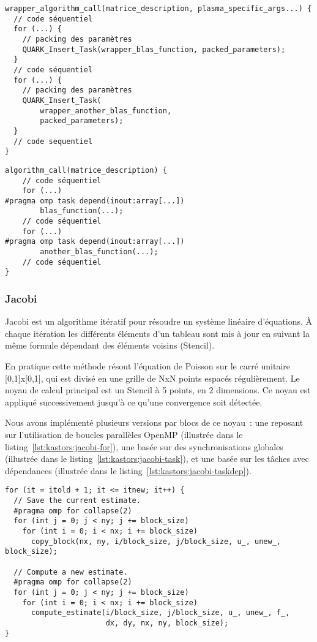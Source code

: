 \begin{lstlisting}[caption=Format de l'algorithme dynamique,label=lst:kastors:dyn]
wrapper_algorithm_call(matrice_description, plasma_specific_args...) {
  // code séquentiel
  for (...) {
    // packing des paramètres
    QUARK_Insert_Task(wrapper_blas_function, packed_parameters);
  }
  // code séquentiel
  for (...) {
    // packing des paramètres
    QUARK_Insert_Task(
        wrapper_another_blas_function,
        packed_parameters);
  }
  // code sequentiel
}
\end{lstlisting}
\begin{lstlisting}[caption=Format de l'algorithme OpenMP,label=lst:kastors:dyn-omp]
algorithm_call(matrice_description) {
    // code séquentiel
    for (...)
#pragma omp task depend(inout:array[...])
        blas_function(...);
    // code séquentiel
    for (...)
#pragma omp task depend(inout:array[...])
        another_blas_function(...);
    // code séquentiel
}
\end{lstlisting}


\subsubsection{Jacobi}

Jacobi est un algorithme itératif pour résoudre un système linéaire d'équations. À chaque itération les différents éléments d'un tableau sont mis à jour en suivant la même formule dépendant des éléments voisins (Stencil).

En pratique cette méthode résout l'équation de Poisson sur le carré unitaire [0,1]x[0,1], qui est divisé en une grille de NxN points espacés régulièrement.
Le noyau de calcul principal est un Stencil à 5 points, en 2 dimensions.
Ce noyau est appliqué successivement jusqu'à ce qu'une convergence soit détectée.

Nous avons implémenté plusieurs versions par blocs de ce noyau~: une reposant sur l'utilisation de boucles parallèles OpenMP (illustrée dans le listing~\ref{lst:kastors:jacobi-for}), une basée sur des synchronisations globales (illustrée dans le listing~\ref{lst:kastors:jacobi-task}), et une basée sur les tâches avec dépendances (illustrée dans le listing~\ref{lst:kastors:jacobi-taskdep}).

\begin{lstlisting}[caption=Boucle itérative principale de Jacobi utilisant des for OpenMP,label=lst:kastors:jacobi-for]
for (it = itold + 1; it <= itnew; it++) {
  // Save the current estimate.
  #pragma omp for collapse(2)
  for (int j = 0; j < ny; j += block_size)
    for (int i = 0; i < nx; i += block_size)
      copy_block(nx, ny, i/block_size, j/block_size, u_, unew_, block_size);

  // Compute a new estimate.
  #pragma omp for collapse(2)
  for (int j = 0; j < ny; j += block_size)
    for (int i = 0; i < nx; i += block_size)
      compute_estimate(i/block_size, j/block_size, u_, unew_, f_,
                       dx, dy, nx, ny, block_size);
}
\end{lstlisting}


